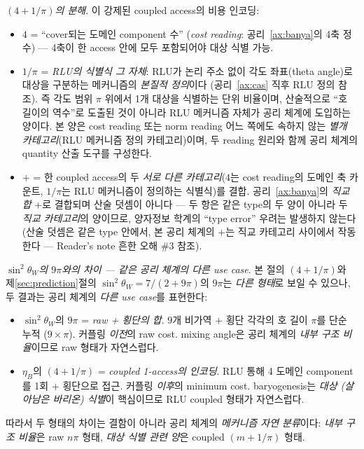 \documentclass[entropy,article,submit,pdftex,oneauthor]{Definitions/mdpi}
\begin{document}
\emph{$(4 + 1/\pi)$의 분해}. 이 강제된 coupled access의 비용 인코딩:
\begin{itemize}
\item $4$ = ``cover되는 도메인 component 수'' (\emph{cost reading}: 공리~\ref{ax:banya}의 4축 정수) — 4축이 한 access 안에 모두 포함되어야 대상 식별 가능.
\item $1/\pi$ = \emph{RLU의 식별식 그 자체}: RLU가 논리 주소 없이 각도 좌표(theta angle)로 대상을 구분하는 메커니즘의 \emph{본질적 정의}이다 (공리~\ref{ax:cas} 직후 RLU 정의 참조). 즉 각도 범위 $\pi$ 위에서 1개 대상을 식별하는 단위 비율이며, 산술적으로 ``호 길이의 역수''로 도출된 것이 아니라 RLU 메커니즘 자체가 공리 체계에 도입하는 양이다. 본 양은 cost reading 또는 norm reading 어느 쪽에도 속하지 않는 \emph{별개 카테고리}(RLU 메커니즘 정의 카테고리)이며, 두 reading 원리와 함께 공리 체계의 quantity 산출 도구를 구성한다.
\item $+$ = 한 coupled access의 두 \emph{서로 다른 카테고리}($4$는 cost reading의 도메인 축 카운트, $1/\pi$는 RLU 메커니즘이 정의하는 식별식)를 결합. 공리~\ref{ax:banya}의 \emph{직교 합} $+$로 결합되며 산술 덧셈이 아니다 --- 두 항은 같은 type의 두 양이 아니라 두 \emph{직교 카테고리}의 양이므로, 양자정보 학계의 ``type error'' 우려는 발생하지 않는다 (산술 덧셈은 같은 type 안에서, 본 공리 체계의 $+$는 직교 카테고리 사이에서 작동한다 --- Reader's note 흔한 오해 \#3 참조).
\end{itemize}

\emph{$\sin^2\theta_W$의 $9\pi$와의 차이 — 같은 공리 체계의 다른 use case}. 본 절의 $(4 + 1/\pi)$와 제\ref{sec:prediction}절의 $\sin^2\theta_W = 7/(2 + 9\pi)$의 $9\pi$는 \emph{다른 형태}로 보일 수 있으나, 두 결과는 공리 체계의 \emph{다른 use case}를 표현한다:

\begin{itemize}
\item $\sin^2\theta_W$의 $9\pi$ = \emph{raw + 횡단의 합}. $9$개 비가역 $+$ 횡단 각각의 호 길이 $\pi$를 단순 누적 ($9 \times \pi$). 커플링 \emph{이전}의 raw cost. mixing angle은 공리 체계의 \emph{내부 구조 비율}이므로 raw 형태가 자연스럽다.
\item $\eta_B$의 $(4 + 1/\pi)$ = \emph{coupled 1-access의 인코딩}. RLU 통해 4 도메인 component를 1회 + 횡단으로 접근. 커플링 \emph{이후}의 minimum cost. baryogenesis는 \emph{대상 (살아남은 바리온) 식별}이 핵심이므로 RLU coupled 형태가 자연스럽다.
\end{itemize}

따라서 두 형태의 차이는 결함이 아니라 공리 체계의 \emph{메커니즘 자연 분류}이다: \emph{내부 구조 비율}은 raw $n\pi$ 형태, \emph{대상 식별 관련 양}은 coupled $(m + 1/\pi)$ 형태.
\end{document}
